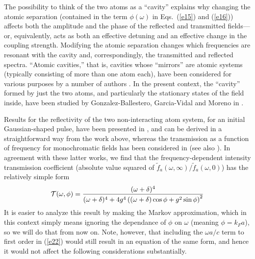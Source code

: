 \documentclass[aps,pra,twocolumn,floatfix,superscriptaddress]{revtex4}
\begin{document}
The possibility to think of the two atoms as a ``cavity'' explains why changing the atomic separation (contained in the term $\phi(\omega)$ in Eqs.~(\ref{e15}) and (\ref{e16})) affects both the amplitude and the phase of the reflected and transmitted fields---or, equivalently, acts as both an effective detuning and an effective change in the coupling strength.   Modifying the atomic separation changes which frequencies are resonant with the cavity and, correspondingly, the transmitted and reflected spectra.  ``Atomic cavities,'' that is, cavities whose ``mirrors'' are atomic systems (typically consisting of more than one atom each), have been considered for various purposes by a number of authors \cite{KimbleCav,scarani2,zubairy2}.  In the present context, the ``cavity'' formed by just the two atoms, and particularly the stationary states of the field inside, have been studied by Gonzalez-Ballestero, Garcia-Vidal and Moreno in \cite{garciavidal1}.  


Results for the reflectivity of the two non-interacting atom system, for an initial Gaussian-shaped pulse, have been presented in \cite{zubairy1}, and can be derived in a straightforward way from the work above, whereas the transmission as a function of frequency for monochromatic fields has been considered in \cite{zheng2,tsoilaw} (see also \cite{scarani1}).  In agreement with these latter works, we find that the frequency-dependent intensity transmission coefficient (absolute value squared of $\tilde f_a(\omega,\infty)/\tilde f_a(\omega,0)$) has the relatively simple form \begin{equation}
{\cal T}(\omega,\phi) = \frac{(\omega+\delta)^4}{(\omega+\delta)^4+4g^4\left((\omega+\delta)\cos\phi+g^2\sin\phi\right)^2} 
\label{e22}
\end{equation}
It is easier to analyze this result by making the Markov approximation, which in this context simply means ignoring the dependance of $\phi$ on $\omega$ (meaning $\phi=k_F a$), so we will do that from now on. Note, however, that including the $\omega a/c$ term to first order in  (\ref{e22}) would still result in an equation of the same form, and hence it would not affect the following considerations substantially.
\end{document}
